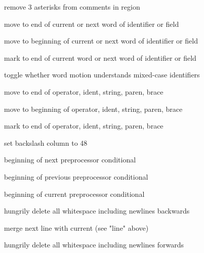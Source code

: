 remove 3 asterisks from comments in region

move to end of current or next word of identifier or field

move to beginning of current or next word of identifier or field

mark to end of current word or next word of identifier or field

toggle whether word motion understands mixed-case identifiers

move to end of operator, ident, string, paren, brace

move to beginning of operator, ident, string, paren, brace

mark to end of operator, ident, string, paren, brace

set backslash column to 48

beginning of next preprocessor conditional

beginning of previous preprocessor conditional

beginning of current preprocessor conditional

hungrily delete all whitespace including newlines backwards

merge next line with current (see "line" above)

hungrily delete all whitespace including newlines forwards

